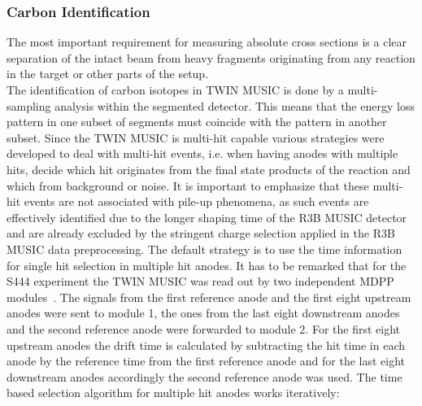 \subsubsection{Carbon Identification}\label{subsec:carbon_id}
The most important requirement for measuring absolute cross sections is a clear separation of the intact beam from heavy fragments originating from any reaction in the target or other parts of the setup.\\
The identification of carbon isotopes in TWIN MUSIC is done by a multi-sampling analysis within the segmented detector. This means that the energy loss pattern in one subset of segments must coincide with the pattern in another subset. Since the TWIN MUSIC is multi-hit capable various strategies were developed to deal with multi-hit events, i.e. when having anodes with multiple hits, decide which hit originates from the final state products of the reaction and which from background or noise. It is important to emphasize that these multi-hit events are not associated with pile-up phenomena, as such events are effectively identified due to the longer shaping time of the R3B MUSIC detector and are already excluded by the stringent charge selection applied in the R3B MUSIC data preprocessing.\newline
The default strategy is to use the time information for single hit selection in multiple hit anodes. It has to be remarked that for the S444 experiment the TWIN MUSIC was read out by two independent MDPP modules~\cite{MDPP-16}. The signals from the first reference anode and the first eight upstream anodes were sent to module 1, the ones from the last eight downstream anodes and the second reference anode were forwarded to module 2. For the first eight upstream anodes the drift time is calculated by subtracting the hit time in each anode by the reference time from the first reference anode and for the last eight downstream anodes accordingly the second reference anode was used.\newline
The time based selection algorithm for multiple hit anodes works iteratively:\newline
